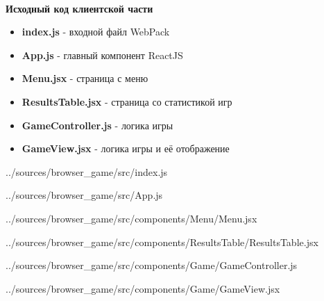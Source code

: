 \documentclass[12pt, a4paper, simple]{eskdtext}
\begin{document}
    

    \paragraph{} \textbf{Исходный код клиентской части}

    \begin{itemize}
        \item \textbf{index.js} - входной файл WebPack
        \item \textbf{App.js} - главный компонент ReactJS
        \item \textbf{Menu.jsx} - страница с меню
        \item \textbf{ResultsTable.jsx} - страница со статистикой игр
        \item \textbf{GameController.js} - логика игры
        \item \textbf{GameView.jsx} - логика игры и её отображение
    \end{itemize}

    
    {../sources/browser_game/src/index.js}

    
    {../sources/browser_game/src/App.js}

    
    {../sources/browser_game/src/components/Menu/Menu.jsx}

    
    {../sources/browser_game/src/components/ResultsTable/ResultsTable.jsx}

    
    {../sources/browser_game/src/components/Game/GameController.js}

    
    {../sources/browser_game/src/components/Game/GameView.jsx}
\end{document}
